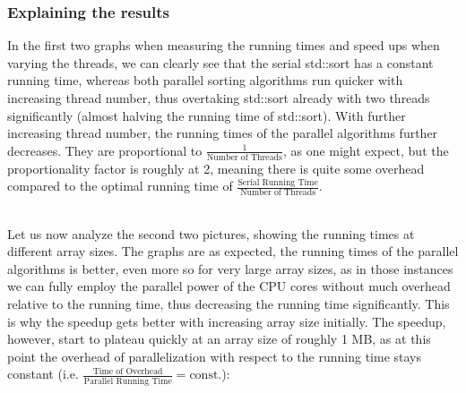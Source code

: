 \documentclass[../../main.tex]{subfiles}
\begin{document}
\bigskip
\subsubsection{Explaining the results}
In the first two graphs when measuring the running times and speed ups when varying the threads, we can clearly see that the serial std::sort has a constant running time, whereas both parallel sorting algorithms run quicker with increasing thread number, thus overtaking std::sort already with two threads significantly (almost halving the running time of std::sort).
With further increasing thread number, the running times of the parallel algorithms further decreases.
They are proportional to $\frac{1}{\text{Number of Threads}}$, as one might expect, but the proportionality factor is roughly at 2, meaning there is quite some overhead compared to the optimal running time of $\frac{\text{Serial Running Time}}{\text{Number of Threads}}$.

\bigskip

~\\
Let us now analyze the second two pictures, showing the running times at different array sizes.
The graphs are as expected, the running times of the parallel algorithms is better, even more so for very large array sizes, as in those instances we can fully employ the parallel power of the CPU cores without much overhead relative to the running time, thus decreasing the running time significantly.
This is why the speedup gets better with increasing array size initially.
The speedup, however, start to plateau quickly at an array size of roughly 1 MB, as at this point the overhead of parallelization with respect to the running time stays constant (i.e. $\frac{\text{Time of Overhead}}{\text{Parallel Running Time}} = \text{const.}$):
\end{document}
